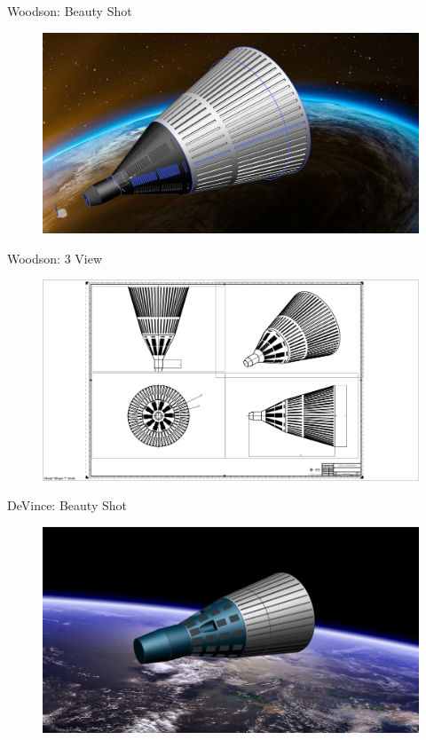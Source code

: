 \documentclass[10pt]{beamer}
\begin{document}
	\begin{frame}{Woodson: Beauty Shot}
\begin{figure}
	\centering
	\includegraphics[width=\textwidth]{Woodson_Beauty.png}
\end{figure}
\end{frame}

	\begin{frame}{Woodson: 3 View}
\begin{figure}
	\centering
	\includegraphics[width=\textwidth]{Woodson_3_View.png}
\end{figure}
\end{frame}

	\begin{frame}{DeVince: Beauty Shot}
\begin{figure}
	\centering
	\includegraphics[width=\textwidth]{DeVince_Beauty.png}
\end{figure}
\end{frame}
\end{document}
